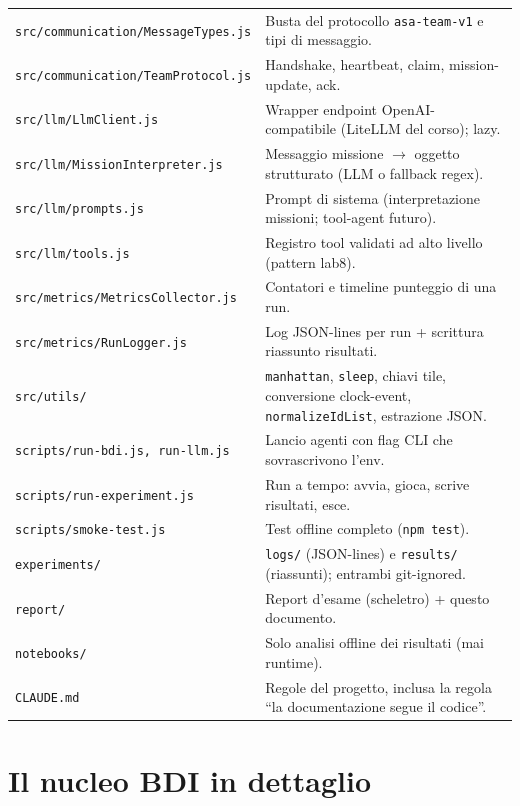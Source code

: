 \documentclass[11pt,a4paper]{article}
\newcommand{\file}[1]{\texttt{#1}}
\newcommand{\code}[1]{\texttt{#1}}
\begin{document}
\begin{longtable}{@{}p{}p{}@{}}
\midrule
\file{src/communication/MessageTypes.js} & Busta del protocollo \code{asa-team-v1} e tipi di messaggio. \\
\file{src/communication/TeamProtocol.js} & Handshake, heartbeat, claim, mission-update, ack. \\
\midrule
\file{src/llm/LlmClient.js} & Wrapper endpoint OpenAI-compatibile (LiteLLM del corso); lazy. \\
\file{src/llm/MissionInterpreter.js} & Messaggio missione $\rightarrow$ oggetto strutturato (LLM o fallback regex). \\
\file{src/llm/prompts.js} & Prompt di sistema (interpretazione missioni; tool-agent futuro). \\
\file{src/llm/tools.js} & Registro tool validati ad alto livello (pattern lab8). \\
\midrule
\file{src/metrics/MetricsCollector.js} & Contatori e timeline punteggio di una run. \\
\file{src/metrics/RunLogger.js} & Log JSON-lines per run + scrittura riassunto risultati. \\
\midrule
\file{src/utils/} & \code{manhattan}, \code{sleep}, chiavi tile, conversione clock-event, \code{normalizeIdList}, estrazione JSON. \\
\midrule
\file{scripts/run-bdi.js, run-llm.js} & Lancio agenti con flag CLI che sovrascrivono l'env. \\
\file{scripts/run-experiment.js} & Run a tempo: avvia, gioca, scrive risultati, esce. \\
\file{scripts/smoke-test.js} & Test offline completo (\code{npm test}). \\
\midrule
\file{experiments/} & \file{logs/} (JSON-lines) e \file{results/} (riassunti); entrambi git-ignored. \\
\file{report/} & Report d'esame (scheletro) + questo documento. \\
\file{notebooks/} & Solo analisi offline dei risultati (mai runtime). \\
\file{CLAUDE.md} & Regole del progetto, inclusa la regola ``la documentazione segue il codice''. \\
\bottomrule
\end{longtable}

\section{Il nucleo BDI in dettaglio}
\end{document}
